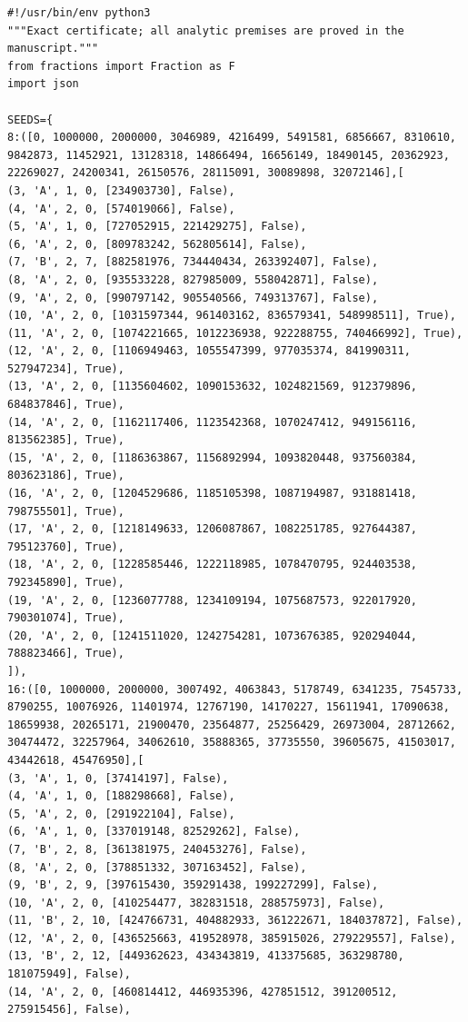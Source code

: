 \documentclass[11pt,reqno]{amsart}
\numberwithin{equation}{section}
\theoremstyle{definition}
\begin{document}
\begin{lstlisting}
#!/usr/bin/env python3
"""Exact certificate; all analytic premises are proved in the manuscript."""
from fractions import Fraction as F
import json

SEEDS={
8:([0, 1000000, 2000000, 3046989, 4216499, 5491581, 6856667, 8310610, 9842873, 11452921, 13128318, 14866494, 16656149, 18490145, 20362923, 22269027, 24200341, 26150576, 28115091, 30089898, 32072146],[
(3, 'A', 1, 0, [234903730], False),
(4, 'A', 2, 0, [574019066], False),
(5, 'A', 1, 0, [727052915, 221429275], False),
(6, 'A', 2, 0, [809783242, 562805614], False),
(7, 'B', 2, 7, [882581976, 734440434, 263392407], False),
(8, 'A', 2, 0, [935533228, 827985009, 558042871], False),
(9, 'A', 2, 0, [990797142, 905540566, 749313767], False),
(10, 'A', 2, 0, [1031597344, 961403162, 836579341, 548998511], True),
(11, 'A', 2, 0, [1074221665, 1012236938, 922288755, 740466992], True),
(12, 'A', 2, 0, [1106949463, 1055547399, 977035374, 841990311, 527947234], True),
(13, 'A', 2, 0, [1135604602, 1090153632, 1024821569, 912379896, 684837846], True),
(14, 'A', 2, 0, [1162117406, 1123542368, 1070247412, 949156116, 813562385], True),
(15, 'A', 2, 0, [1186363867, 1156892994, 1093820448, 937560384, 803623186], True),
(16, 'A', 2, 0, [1204529686, 1185105398, 1087194987, 931881418, 798755501], True),
(17, 'A', 2, 0, [1218149633, 1206087867, 1082251785, 927644387, 795123760], True),
(18, 'A', 2, 0, [1228585446, 1222118985, 1078470795, 924403538, 792345890], True),
(19, 'A', 2, 0, [1236077788, 1234109194, 1075687573, 922017920, 790301074], True),
(20, 'A', 2, 0, [1241511020, 1242754281, 1073676385, 920294044, 788823466], True),
]),
16:([0, 1000000, 2000000, 3007492, 4063843, 5178749, 6341235, 7545733, 8790255, 10076926, 11401974, 12767190, 14170227, 15611941, 17090638, 18659938, 20265171, 21900470, 23564877, 25256429, 26973004, 28712662, 30474472, 32257964, 34062610, 35888365, 37735550, 39605675, 41503017, 43442618, 45476950],[
(3, 'A', 1, 0, [37414197], False),
(4, 'A', 1, 0, [188298668], False),
(5, 'A', 2, 0, [291922104], False),
(6, 'A', 1, 0, [337019148, 82529262], False),
(7, 'B', 2, 8, [361381975, 240453276], False),
(8, 'A', 2, 0, [378851332, 307163452], False),
(9, 'B', 2, 9, [397615430, 359291438, 199227299], False),
(10, 'A', 2, 0, [410254477, 382831518, 288575973], False),
(11, 'B', 2, 10, [424766731, 404882933, 361222671, 184037872], False),
(12, 'A', 2, 0, [436525663, 419528978, 385915026, 279229557], False),
(13, 'B', 2, 12, [449362623, 434343819, 413375685, 363298780, 181075949], False),
(14, 'A', 2, 0, [460814412, 446935396, 427851512, 391200512, 275915456], False),

\end{lstlisting}
\end{document}
